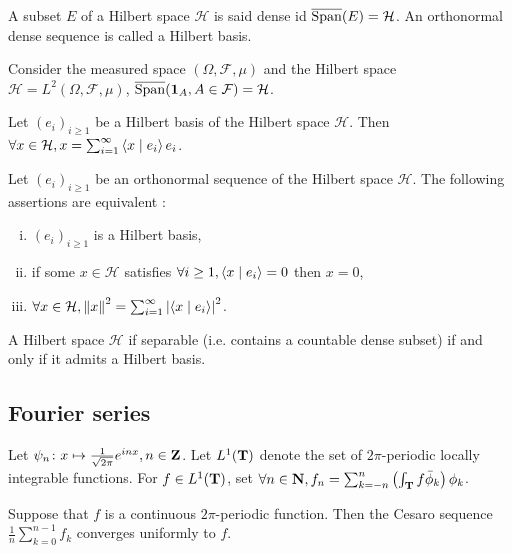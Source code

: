 	\begin{defn}
		A subset $E$ of a Hilbert space $\mathcal{H}$ is said dense id $\overline{\operatorname{Span}}(E) = \mathcal{H}$.
		An orthonormal dense sequence is called a Hilbert basis.
	\end{defn}

	\begin{pop}
		Consider the measured space $(\Omega, \mathcal{F}, \mu)$ and the Hilbert space $\mathcal{H} = L^2(\Omega, \mathcal{F}, \mu)$, $\overline{\operatorname{Span}}(\operatorname{\mathbf{1}}_A, A \in \mathcal{F}) = \mathcal{H}$.
	\end{pop}

	\begin{thm}
		Let $(e_i)_{i \geq 1}$ be a Hilbert basis of the Hilbert space $\mathcal{H}$.
		Then $\forall x \in \mathcal{H}, x = \sum_{i = 1}^\infty \left\langle x \mid e_i \right\rangle e_i$.
	\end{thm}

	\begin{thm}
		Let $(e_i)_{i \geq 1}$ be an orthonormal sequence of the Hilbert space $\mathcal{H}$.
		The following assertions are equivalent :
		\begin{enumerate}[(i)]
			\item $(e_i)_{i \geq 1}$ is a Hilbert basis,
			\item if some $x \in \mathcal{H}$ satisfies $\forall i \geq 1, \left\langle x \mid e_i \right\rangle = 0$ then $x = 0$,
			\item $\forall x \in \mathcal{H}, \left\lVert x\right\rVert^2 = \sum_{i = 1}^\infty \left\lvert\left\langle x \mid e_i \right\rangle\right\rvert^2$.
		\end{enumerate}
	\end{thm}

	\begin{thm}
		A Hilbert space $\mathcal{H}$ if separable (i.e. contains a countable dense subset) if and only if it admits a Hilbert basis.
	\end{thm}


\subsection*{Fourier series}

	Let $\psi_n \colon x \mapsto \frac{1}{\sqrt{2\pi}} e^{inx}, n \in \mathbf{Z}$.
	Let $L^1(\mathbf{T})$ denote the set of $2\pi$-periodic locally integrable functions.
	For $f \in L^1(\mathbf{T})$, set $\forall n \in \mathbf{N}, f_n = \sum_{k = -n}^n \left( \int_{\mathbf{T}} f \bar\phi_k \right) \phi_k$.

	\begin{thm}
		Suppose that $f$ is a continuous $2\pi$-periodic function.
		Then the Cesaro sequence $\frac{1}{n} \sum_{k = 0}^{n - 1} f_k$ converges uniformly to $f$.
	\end{thm}

